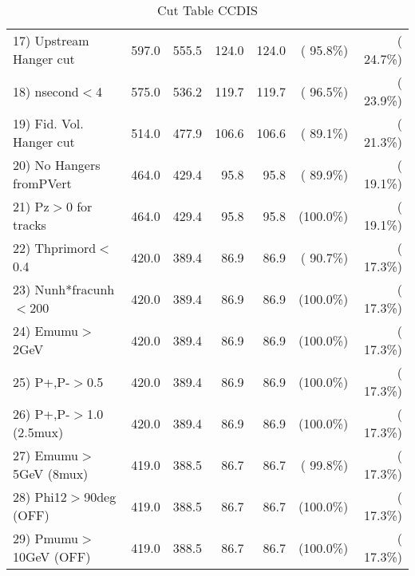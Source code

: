 \begin{table}[h!]
\begin{tabular}{||l||r|r|r|r|r|r||}
 17) Upstream Hanger cut  &        597.0 &        555.5 &        124.0 &        124.0 & ( 95.8\%) & ( 24.7\%) \\
 18) nsecond$<$4          &        575.0 &        536.2 &        119.7 &        119.7 & ( 96.5\%) & ( 23.9\%) \\
 19) Fid. Vol. Hanger cut &        514.0 &        477.9 &        106.6 &        106.6 & ( 89.1\%) & ( 21.3\%) \\
 20) No Hangers fromPVert &        464.0 &        429.4 &         95.8 &         95.8 & ( 89.9\%) & ( 19.1\%) \\
 21) Pz$>$0 for tracks    &        464.0 &        429.4 &         95.8 &         95.8 & (100.0\%) & ( 19.1\%) \\
 22) Thprimord$<$0.4      &        420.0 &        389.4 &         86.9 &         86.9 & ( 90.7\%) & ( 17.3\%) \\
 23) Nunh*fracunh$<$200   &        420.0 &        389.4 &         86.9 &         86.9 & (100.0\%) & ( 17.3\%) \\
 24) Emumu$>$2GeV         &        420.0 &        389.4 &         86.9 &         86.9 & (100.0\%) & ( 17.3\%) \\
 25) P+,P-$>$0.5          &        420.0 &        389.4 &         86.9 &         86.9 & (100.0\%) & ( 17.3\%) \\
 26) P+,P-$>$1.0 (2.5mux) &        420.0 &        389.4 &         86.9 &         86.9 & (100.0\%) & ( 17.3\%) \\
 27) Emumu$>$5GeV  (8mux) &        419.0 &        388.5 &         86.7 &         86.7 & ( 99.8\%) & ( 17.3\%) \\
 28) Phi12$>$90deg  (OFF) &        419.0 &        388.5 &         86.7 &         86.7 & (100.0\%) & ( 17.3\%) \\
 29) Pmumu$>$10GeV  (OFF) &        419.0 &        388.5 &         86.7 &         86.7 & (100.0\%) & ( 17.3\%) \\
 \hline
 \hline
 \end{tabular}
 \caption{Cut Table  CCDIS    }
 \label{tab-cutcohjpsi-mumu_ncdis}
 \end{table}
